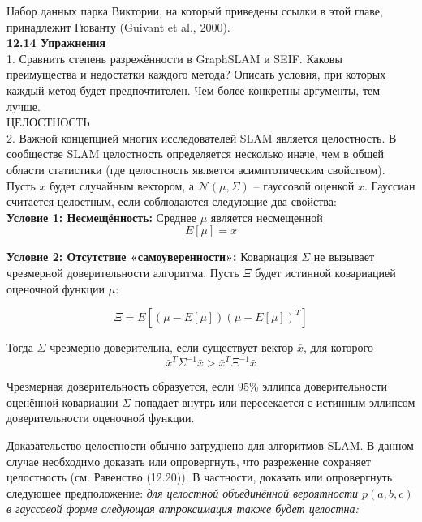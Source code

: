 \documentclass[10pt,a4paper]{article}
\begin{document}
Набор данных парка Виктории, на который приведены ссылки в этой главе, принадлежит Гюванту (Guivant et al., 2000).\\

\textbf{12.14	Упражнения}\\

1.	Сравнить степень разрежённости в GraphSLAM и SEIF. Каковы преимущества и недостатки каждого метода? Описать условия, при которых каждый метод будет предпочтителен. Чем более конкретны аргументы, тем лучше.\\

ЦЕЛОСТНОСТЬ\\

2.	Важной концепцией многих исследователей SLAM является целостность. В сообществе SLAM целостность определяется несколько иначе, чем в общей области статистики (где целостность является асимптотическим свойством).\\

Пусть $x$ будет случайным вектором, а $\mathcal{N}(\mu,\varSigma)$ – гауссовой оценкой $x$. Гауссиан считается целостным, если соблюдаются следующие два свойства:\\

\textbf{Условие 1: Несмещённость:} Среднее $\mu$ является несмещенной\\

$$E[\mu]=x$$ 

\textbf{Условие 2: Отсутствие «самоуверенности»:} Ковариация $\varSigma$ не вызывает чрезмерной доверительности алгоритма.
Пусть $\varXi$ будет истинной ковариацией оценочной функции $\mu$:

$$\varXi=E[(\mu-E[\mu])(\mu-E[\mu])^T]$$

Тогда $\varSigma$ чрезмерно доверительна, если существует вектор $\bar{x}$, для которого\\

$$\bar{x}^T\varSigma^{-1}\bar{x}>\bar{x}^T\varXi^{-1}\bar{x}$$

Чрезмерная доверительность образуется, если 95\% эллипса доверительности оценённой ковариации $\varSigma$ попадает внутрь или пересекается с истинным эллипсом доверительности оценочной функции. 

Доказательство целостности обычно затруднено для алгоритмов SLAM. В данном случае необходимо доказать или опровергнуть, что разрежение сохраняет целостность (см. Равенство (12.20)). В частности, доказать или опровергнуть следующее предположение: \textit{для целостной объединённой вероятности $p(a, b, c)$ в гауссовой форме следующая аппроксимация также будет целостна:}\\
\end{document}
